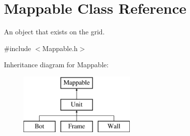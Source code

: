 \hypertarget{classMappable}{
\section{Mappable Class Reference}
\label{classMappable}
}


An object that exists on the grid.  




{\ttfamily \#include $<$Mappable.h$>$}

Inheritance diagram for Mappable:\begin{figure}[H]
\begin{center}
\leavevmode
\includegraphics[height=3cm]{classMappable}
\end{center}
\end{figure}
